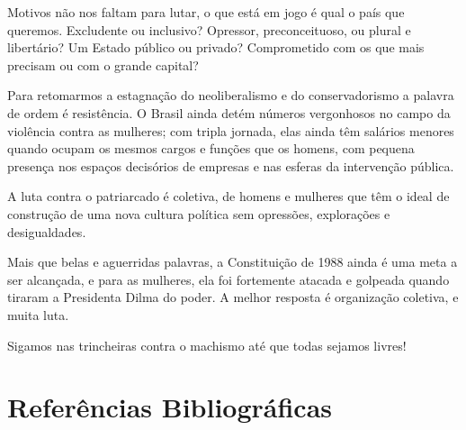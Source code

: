 Motivos não nos faltam para lutar, o que está em jogo é qual o país que
queremos. Excludente ou inclusivo? Opressor, preconceituoso, ou plural e
libertário? Um Estado público ou privado? Comprometido com os que mais
precisam ou com o grande capital?

Para retomarmos a estagnação do neoliberalismo e do conservadorismo a
palavra de ordem é resistência. O Brasil ainda detém números vergonhosos
no campo da violência contra as mulheres; com tripla jornada, elas ainda
têm salários menores quando ocupam os mesmos cargos e funções que os
homens, com pequena presença nos espaços decisórios de empresas e nas
esferas da intervenção pública.

A luta contra o patriarcado é coletiva, de homens e mulheres que têm o
ideal de construção de uma nova cultura política sem opressões,
explorações e desigualdades.

Mais que belas e aguerridas palavras, a Constituição de 1988 ainda é uma
meta a ser alcançada, e para as mulheres, ela foi fortemente atacada e
golpeada quando tiraram a Presidenta Dilma do poder. A melhor resposta é
organização coletiva, e muita luta.

Sigamos nas trincheiras contra o machismo até que todas sejamos livres!

\section{Referências Bibliográficas}

